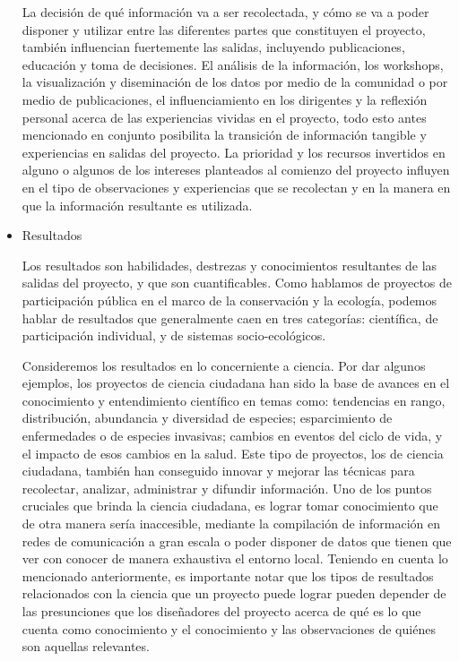 \begin{itemize}
		La decisión de qué información va a ser recolectada, y cómo se va a poder disponer y utilizar entre las diferentes partes que constituyen el proyecto, también influencian fuertemente las salidas, incluyendo publicaciones, educación y toma de decisiones. El análisis de la información, los workshops, la visualización y diseminación de los datos por medio de la comunidad o por medio de publicaciones, el influenciamiento en los dirigentes y la reflexión personal acerca de las experiencias vividas en el proyecto, todo esto antes mencionado en conjunto posibilita la transición de información tangible y experiencias en salidas del proyecto. La prioridad y los recursos invertidos en alguno o algunos de los intereses planteados al comienzo del proyecto influyen en el tipo de observaciones y experiencias que se recolectan  y en la manera en que la información resultante es utilizada.
		
		\item {Resultados}
		
		Los resultados son habilidades, destrezas y conocimientos resultantes de las salidas del proyecto, y que son cuantificables. Como hablamos de proyectos de participación pública en el marco de la conservación y la ecología, podemos hablar de resultados que generalmente caen en tres categorías: científica, de participación individual, y de sistemas socio-ecológicos. 
		
		Consideremos los resultados en lo concerniente a ciencia. Por dar algunos ejemplos, los proyectos de ciencia ciudadana han sido la base de avances en el conocimiento y entendimiento científico en temas como: tendencias en rango, distribución, abundancia y diversidad de especies; esparcimiento de enfermedades o de especies invasivas; cambios en eventos del ciclo de vida, y el impacto de esos cambios en la salud. Este tipo de proyectos, los de ciencia ciudadana, también han conseguido innovar y mejorar las técnicas para recolectar, analizar, administrar y difundir información. Uno de los puntos cruciales que brinda la ciencia ciudadana, es lograr tomar conocimiento que de otra manera sería inaccesible, mediante la compilación de información en redes de comunicación a gran escala o poder disponer de datos que tienen que ver con conocer de manera exhaustiva el entorno local. Teniendo en cuenta lo mencionado anteriormente, es importante notar que los tipos de resultados relacionados con la ciencia que un proyecto puede lograr pueden depender de las presunciones que los diseñadores del proyecto acerca de qué es lo que cuenta como conocimiento y el conocimiento y las observaciones de quiénes son aquellas relevantes.
		

\end{itemize}
